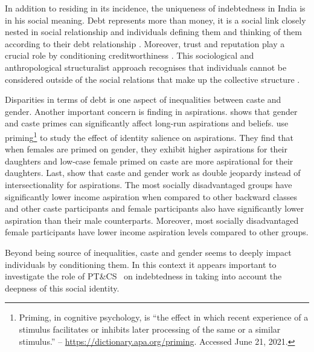 \documentclass[a4paper, 12pt, onecolumn]{article}
\newcommand{\PTCS}{PT\&CS}
\begin{document}
In addition to residing in its incidence, the uniqueness of indebtedness in India is in his social meaning. 
Debt represents more than money, it is a social link closely nested in social relationship and individuals defining them and thinking of them according to their debt relationship \citep{Guerin2014}. 
Moreover, trust and reputation play a crucial role by conditioning creditworthiness \citep{Guerin2021}.
This sociological and anthropological structuralist approach recognises that individuals cannot be considered outside of the social relations that make up the collective structure \citep{Polanyi1944}. 


Disparities in terms of debt is one aspect of inequalities between caste and gender.
Another important concern is finding in aspirations.
\cite{Mukherjee2017} shows that gender and caste primes can significantly affect long-run aspirations and beliefs. 
\cite{Alvi2019} use priming\footnote{Priming, in cognitive psychology, is ``the effect in which recent experience of a stimulus facilitates or inhibits later processing of the same or a similar stimulus.'' -- \url{https://dictionary.apa.org/priming}. Accessed June 21, 2021.} to study the effect of identity salience on aspirations.
They find that when females are primed on gender, they exhibit higher aspirations for their daughters and low-case female primed on caste are more aspirational for their daughters.
Last, \cite{Sarkar2020} show that caste and gender work as double jeopardy instead of intersectionality for aspirations.
The most socially disadvantaged groups have significantly lower income aspiration when compared to other backward classes and other caste participants and female participants also have significantly lower aspiration than their male counterparts.
Moreover, most socially disadvantaged female participants have lower income aspiration levels compared to other groups.

Beyond being source of inequalities, caste and gender seems to deeply impact individuals by conditioning them.
In this context it appears important to investigate the role of \PTCS~ on indebtedness in taking into account the deepness of this social identity.

\end{document}
